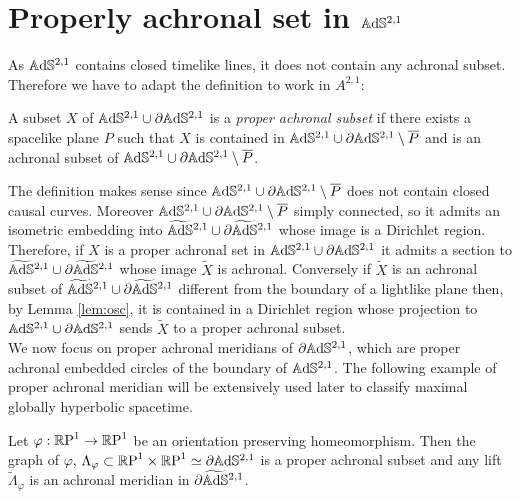 \section{Properly achronal set in $\A^{2,1}$}
As $\A^{2,1}$ contains closed timelike lines, it does not contain any achronal subset. Therefore we have to adapt the definition to work in $A^{2,1}$:
\begin{definition}
    A subset $X$ of $\A^{2,1} \cup \partial\A^{2,1}$ is a \textit{proper achronal subset} if there exists a spacelike plane $P$ such that $X$ is contained in $\A^{2,1} \cup \partial\A^{2,1} \setminus \overline{P}$ and is an achronal subset of $\A^{2,1} \cup \partial\A^{2,1} \setminus \overline{P}$.
\end{definition}
The definition makes sense since $\A^{2,1} \cup \partial\A^{2,1} \setminus \overline{P}$ does not contain closed causal curves. Moreover $\A^{2,1} \cup \partial\A^{2,1} \setminus \overline{P}$ simply connected, so it admits an isometric embedding into $\AS^{2,1} \cup \partial\AS^{2,1}$ whose image is a Dirichlet region. Therefore, if $X$ is a proper achronal set in $\A^{2,1} \cup \partial\A^{2,1}$ it admits a section to $\AS^{2,1} \cup \partial\AS^{2,1}$ whose image $\widetilde{X}$ is achronal. Conversely if $\widetilde{X}$ is an achronal subset of $\AS^{2,1} \cup \partial\AS^{2,1}$ different from the boundary of a lightlike plane then, by Lemma \ref{lem:osc}, it is contained in a Dirichlet region whose projection to $\A^{2,1} \cup \partial\A^{2,1}$ sends $\widetilde{X}$ to a proper achronal subset.\\
We now focus on proper achronal meridians of $\partial\A^{2,1}$, which are proper achronal embedded circles of the boundary of $\A^{2,1}$. The following example of proper achronal meridian will be extensively used later to classify maximal globally hyperbolic spacetime.
\begin{lemma}
    Let $\varphi: \S \to \S$ be an orientation preserving homeomorphism. Then the graph of $\varphi$, $\Lambda_\varphi \subset \T \simeq \partial\A^{2,1}$ is a proper achronal subset and any lift $\widetilde{\Lambda}_\varphi$ is an achronal meridian in $\partial\AS^{2,1}$.
\end{lemma}
